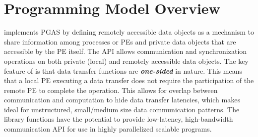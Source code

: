 \section{Programming Model Overview}
\openshmem implements \ac{PGAS} by defining remotely accessible data objects as a mechanism to share information among \openshmem processes or \acp{PE} and private data objects that are accessible by the \ac{PE} 
itself. The \ac{API} allows communication and synchronization operations on both private (local) and remotely accessible data objects. The key feature of \openshmem is that data transfer functions are \textit{\textbf{one-sided}} in nature. This means that a local \ac{PE} executing a data transfer does not require the participation of the remote \ac{PE} to complete the operation. This allows for overlap between communication and computation to hide data transfer latencies, which makes  \openshmem ideal for unstructured, small/medium size data communication patterns. The \openshmem library functions have the potential to provide low-latency, high-bandwidth communication \ac{API} for use in highly parallelized scalable programs. 



